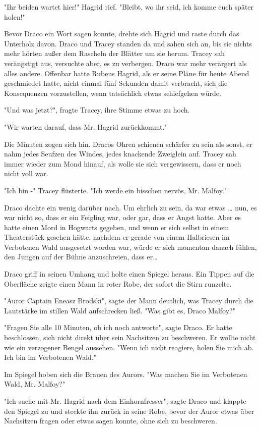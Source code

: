 {"Ihr beiden wartet hier!" Hagrid rief. "Bleibt, wo ihr seid, ich komme euch später holen!"

Bevor Draco ein Wort sagen konnte, drehte sich Hagrid und raste durch das Unterholz davon. Draco und Tracey standen da und sahen sich an, bis sie nichts mehr hörten außer dem Rascheln der Blätter um sie herum. Tracey sah verängstigt aus, versuchte aber, es zu verbergen. Draco war mehr verärgert als alles andere. Offenbar hatte Rubeus Hagrid, als er seine Pläne für heute Abend geschmiedet hatte, nicht einmal fünf Sekunden damit verbracht, sich die Konsequenzen vorzustellen, wenn tatsächlich etwas schiefgehen würde.

"Und was jetzt?", fragte Tracey, ihre Stimme etwas zu hoch.

"Wir warten darauf, dass Mr. Hagrid zurückkommt."

Die Minuten zogen sich hin. Dracos Ohren schienen schärfer zu sein als sonst, er nahm jedes Seufzen des Windes, jedes knackende Zweiglein auf. Tracey sah immer wieder zum Mond hinauf, als wolle sie sich vergewissern, dass er noch nicht voll war.

"Ich bin -" Tracey flüsterte. "Ich werde ein bisschen nervös, Mr. Malfoy."

Draco dachte ein wenig darüber nach. Um ehrlich zu sein, da war etwas … nun, es war nicht so, dass er ein Feigling war, oder gar, dass er Angst hatte. Aber es hatte einen Mord in Hogwarts gegeben, und wenn er sich selbst in einem Theaterstück gesehen hätte, nachdem er gerade von einem Halbriesen im Verbotenen Wald ausgesetzt worden war, würde er sich momentan danach fühlen, den Jungen auf der Bühne anzuschreien, dass er…

Draco griff in seinen Umhang und holte einen Spiegel heraus. Ein Tippen auf die Oberfläche zeigte einen Mann in roter Robe, der sofort die Stirn runzelte.

"Auror Captain Eneasz Brodski", sagte der Mann deutlich, was Tracey durch die Lautstärke im stillen Wald aufschrecken ließ. "Was gibt es, Draco Malfoy?"

"Fragen Sie alle 10 Minuten, ob ich noch antworte", sagte Draco. Er hatte beschlossen, sich nicht direkt über sein Nachsitzen zu beschweren. Er wollte nicht wie ein verzogener Bengel aussehen. "Wenn ich nicht reagiere, holen Sie mich ab. Ich bin im Verbotenen Wald."

Im Spiegel hoben sich die Brauen des Aurors. "Was machen Sie im Verbotenen Wald, Mr. Malfoy?"

"Ich suche mit Mr. Hagrid nach dem Einhornfresser", sagte Draco und klappte den Spiegel zu und steckte ihn zurück in seine Robe, bevor der Auror etwas über Nachsitzen fragen oder etwas sagen konnte, ohne sich zu beschweren.

}
